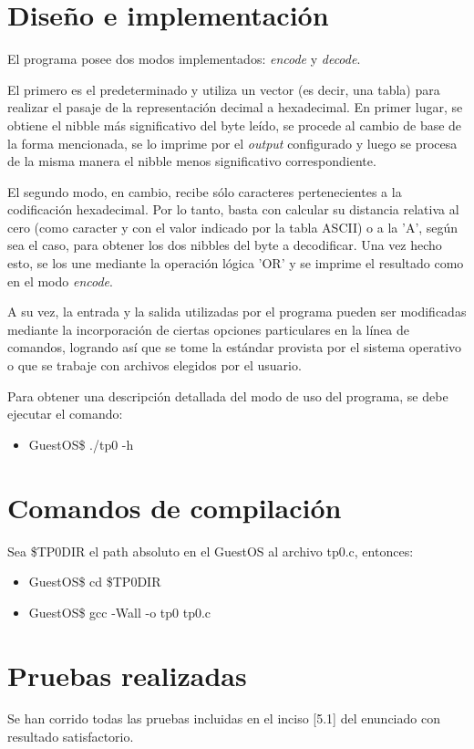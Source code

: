 \documentclass{article}
\begin{document}
\section{Diseño e implementaci\'on}
El programa posee dos modos implementados: \textit{encode} y \textit{decode}.\par
El primero es el predeterminado y utiliza un vector (es decir, una tabla) para realizar el pasaje de la representaci\'on decimal a hexadecimal. En primer lugar, se obtiene el nibble más significativo del byte le\'ido, se procede al cambio de base de la forma mencionada, se lo imprime por el \textit{output} configurado y luego se procesa de la misma manera el nibble menos significativo correspondiente.\par
El segundo modo, en cambio, recibe s\'olo caracteres pertenecientes a la codificaci\'on hexadecimal. Por lo tanto, basta con calcular su distancia relativa al cero (como caracter y con el valor indicado por la tabla ASCII) o a la 'A', seg\'un sea el caso, para obtener los dos nibbles del byte a decodificar. Una vez hecho esto, se los une mediante la operaci\'on l\'ogica 'OR' y se imprime el resultado como en el modo \textit{encode}.\par
A su vez, la entrada y la salida utilizadas por el programa pueden ser modificadas mediante la incorporaci\'on de ciertas opciones particulares en la l\'inea de comandos, logrando as\'i que se tome la est\'andar provista por el sistema operativo o que se trabaje con archivos elegidos por el usuario.\par
Para obtener una descripci\'on detallada del modo de uso del programa, se debe ejecutar el comando:
\begin{itemize}
\item GuestOS\$ ./tp0 -h
\end{itemize}

\section{Comandos de compilaci\'on}
Sea \$TP0DIR el path absoluto en el GuestOS al archivo tp0.c, entonces:
\begin{itemize}
\item GuestOS\$ cd \$TP0DIR
\item GuestOS\$ gcc -Wall -o tp0 tp0.c
\end{itemize}

\section{Pruebas realizadas}
Se han corrido todas las pruebas incluidas en el inciso [5.1] del enunciado con resultado satisfactorio.
\end{document}

